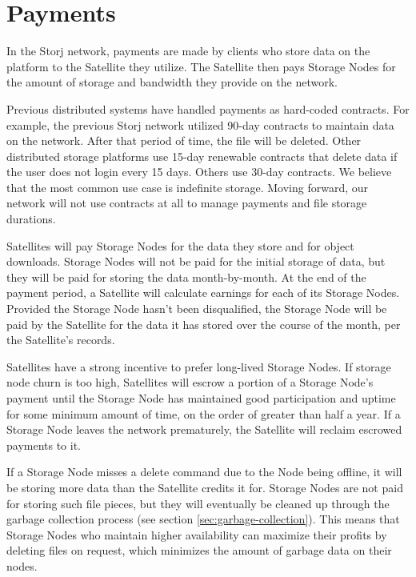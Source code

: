 \documentclass[8pt,fleqn,openany]{book}
\begin{document}
\section{Payments}\label{sec:concrete-payments}

In the Storj network, payments are made by clients who store data on the
platform to the Satellite they utilize.
The Satellite then pays Storage Nodes for the amount of storage and bandwidth
they
provide on the network.

Previous distributed systems have handled payments as hard-coded contracts.
For example, the previous Storj network utilized 90-day contracts to maintain
data on the network. After that period of time, the file will be deleted.
Other distributed storage platforms use 15-day renewable contracts that delete
data if the user does not login every 15 days. Others use 30-day contracts.
We believe that the most common use case is indefinite storage.
Moving forward, our network will not use contracts at all to manage payments
and file storage durations.

Satellites will pay Storage Nodes for the data they store
and for object downloads.
Storage Nodes will not be paid for the initial storage of data, but they
will be paid for storing the data month-by-month. At the end of the payment
period, a Satellite will calculate earnings for each of its Storage Nodes.
Provided the Storage Node hasn't been disqualified,
the Storage Node will be paid by the Satellite for the data it has stored
over the course of
the month, per the Satellite's records.

Satellites have a strong incentive to prefer long-lived Storage Nodes. If
storage node churn is too high, Satellites will escrow a portion of a Storage
Node's payment until the Storage Node has maintained good participation and
uptime for some minimum amount of time, on the order of greater than half a year.
If a Storage Node leaves the network prematurely, the Satellite will reclaim
escrowed payments to it.

If a Storage Node misses a delete command due to the Node being
offline, it will be storing more data than the Satellite credits it for.
Storage Nodes are not paid for storing such file pieces, but they
will eventually be cleaned up through the garbage collection process
(see section \ref{sec:garbage-collection}).
This means that Storage Nodes who maintain higher availability
can maximize their profits by deleting files on request,
which minimizes the amount
of garbage data on their nodes.
\end{document}
